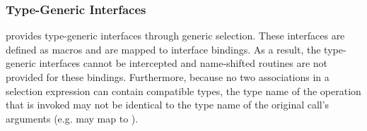 \subsubsection{\Cstd[11] Type-Generic Interfaces}
\label{sec:pshmem_c11_type_generic_interfaces}
\openshmem provides type-generic interfaces through \Cstd[11]
generic selection. These interfaces are defined as macros
and are mapped to \Cstd interface bindings. As a result, the
\Cstd[11] type-generic interfaces cannot be intercepted and
name-shifted  routines are not provided for these
bindings. Furthermore, because no two associations in a \Cstd[11]
 selection expression can contain compatible types,
the type name of the \Cstd operation that is invoked may not be
identical to the type name of the original call's arguments (e.g.
 may map to ).
